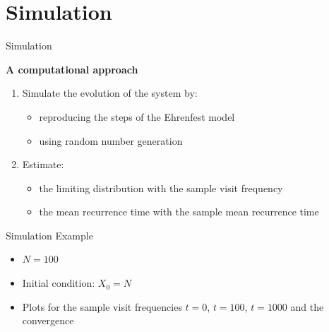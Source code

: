\label{simulation}
\section{Simulation}

\begin{frame}{Simulation}
    \begin{center}
        \Large \textbf{A computational approach}
    \end{center}
    \centering
    \begin{enumerate}
        \item<1-> \alert{Simulate} the evolution of the system by:
        \begin{itemize}
            \item reproducing the steps of the Ehrenfest model
            \item using random number generation
        \end{itemize}
        \item<2-> \alert{Estimate}:
        \begin{itemize}
            \item the limiting distribution with the sample visit frequency 
            \item the mean recurrence time with the sample mean recurrence time
        \end{itemize}
    \end{enumerate}
\end{frame}

\begin{frame}{Simulation}
    \Large Example
    \normalsize
    \begin{itemize}
        \item $N = 100$
        \item Initial condition: $X_0 = N$
        \item Plots for the sample visit frequencies $t = 0$, $t = 100$, $t = 1000$ and the convergence
    \end{itemize}
    
\end{frame}

